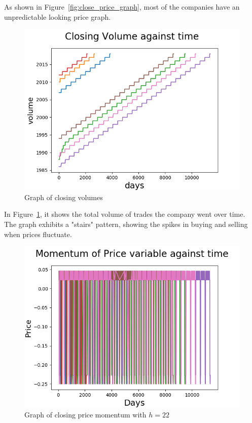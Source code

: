 \documentclass[8pt]{article}
\begin{document}
	As shown in Figure~\ref{fig:close_price_graph}, most of the companies have an unpredictable looking price graph.

	\begin{figure}[h]
		\centering
		\includegraphics{all_closing_volume.png}
		\caption{Graph of closing volumes}
		\label{fig:close_volume_graph}
	\end{figure}

	In Figure~\ref{fig:close_volume_graph}, it shows the total volume of trades the company went over time.
	The graph exhibits a "stairs" pattern, showing the spikes in buying and selling when prices fluctuate.

	\begin{figure}[h]
		\centering
		\includegraphics{all_momentum_step_22.png}
		\caption{Graph of closing price momentum with $h=22$}
		\label{fig:close_m22_graph}
	\end{figure}
\end{document}
